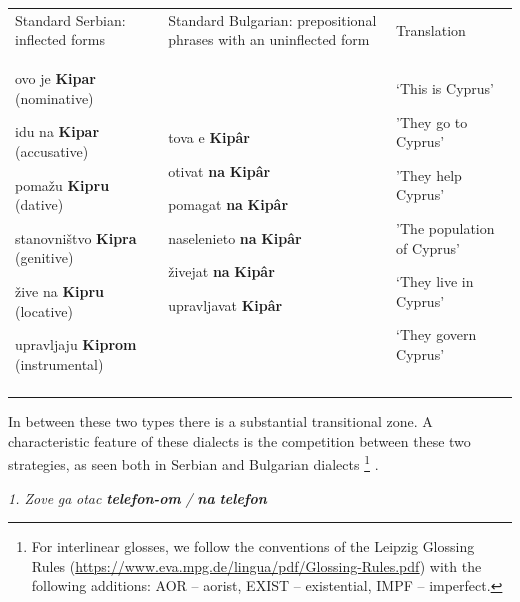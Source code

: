 \documentclass[output=paper]{langscibook}
\begin{document}
\begin{tabularx}{\textwidth}{XXX}

\lsptoprule

Standard Serbian: inflected forms & Standard Bulgarian: prepositional phrases with an uninflected form & Translation\\
ovo je \textbf{Kipar} (nominative)

idu na \textbf{Kipar} (accusative)

pomažu \textbf{Kipru} (dative)

stanovništvo \textbf{Kipra} (genitive)

žive na \textbf{Kipru}  (locative)

upravljaju \textbf{Kiprom} (instrumental) & tova e \textbf{Kipâr}

otivat \textbf{na} \textbf{Kipâr}

pomagat \textbf{na} \textbf{Kipâr}

 naselenieto \textbf{na} \textbf{Kipâr}

živejat \textbf{na} \textbf{Kipâr}

upravljavat  \textbf{Kipâr} & ‘This is Cyprus’ 

{}'They go to Cyprus'

{}'They help Cyprus'

{}'The population of Cyprus'

‘They live in Cyprus’

‘They govern Cyprus’\\
\lspbottomrule
\end{tabularx}
\begin{table}
\caption{Nominal inflection in Serbian and corresponding forms in Bulgarian}
\label{tab:key:1}
\end{table}

In between these two types there is a substantial transitional zone. A characteristic feature of these dialects is the competition between these two strategies, as seen both in Serbian  and Bulgarian dialects \footnote{For interlinear glosses, we follow the conventions of the Leipzig Glossing Rules (\url{https://www.eva.mpg.de/lingua/pdf/Glossing-Rules.pdf}) with the following additions: AOR – aorist, EXIST – existential, IMPF – imperfect.} .

\textit{1.  Zove}  \textit{ga}  \textit{otac}  \textbf{\textit{telefon-om}}  \textit{/}  \textbf{\textit{na}}  \textbf{\textit{telefon}}
\end{document}
